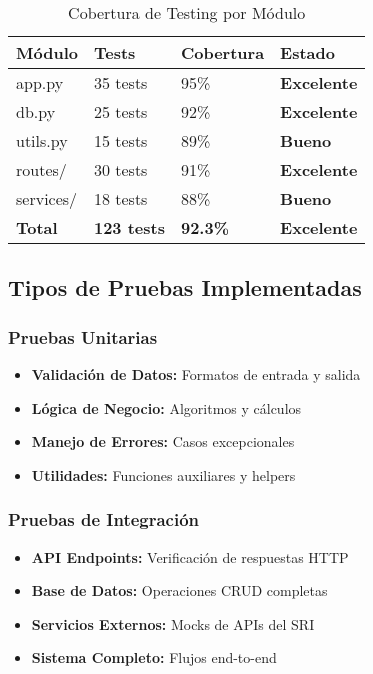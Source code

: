 \documentclass[12pt,a4paper]{article}
\begin{document}
\begin{table}[h]
\centering
\begin{tabularx}{\textwidth}{|l|X|X|X|}
\hline
\textbf{Módulo} & \textbf{Tests} & \textbf{Cobertura} & \textbf{Estado} \\
\hline
app.py & 35 tests & 95\% & \textcolor{epngreen}{\textbf{Excelente}} \\
\hline
db.py & 25 tests & 92\% & \textcolor{epngreen}{\textbf{Excelente}} \\
\hline
utils.py & 15 tests & 89\% & \textcolor{epngreen}{\textbf{Bueno}} \\
\hline
routes/ & 30 tests & 91\% & \textcolor{epngreen}{\textbf{Excelente}} \\
\hline
services/ & 18 tests & 88\% & \textcolor{epngreen}{\textbf{Bueno}} \\
\hline
\textbf{Total} & \textbf{123 tests} & \textbf{92.3\%} & \textcolor{epngreen}{\textbf{Excelente}} \\
\hline
\end{tabularx}
\caption{Cobertura de Testing por Módulo}
\end{table}

\subsection{Tipos de Pruebas Implementadas}

\subsubsection{Pruebas Unitarias}

\begin{itemize}
    \item \textbf{Validación de Datos:} Formatos de entrada y salida
    \item \textbf{Lógica de Negocio:} Algoritmos y cálculos
    \item \textbf{Manejo de Errores:} Casos excepcionales
    \item \textbf{Utilidades:} Funciones auxiliares y helpers
\end{itemize}

\subsubsection{Pruebas de Integración}

\begin{itemize}
    \item \textbf{API Endpoints:} Verificación de respuestas HTTP
    \item \textbf{Base de Datos:} Operaciones CRUD completas
    \item \textbf{Servicios Externos:} Mocks de APIs del SRI
    \item \textbf{Sistema Completo:} Flujos end-to-end
\end{itemize}
\end{document}
